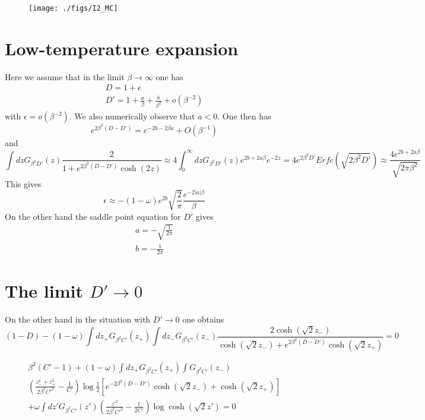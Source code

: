 \documentclass[onecolumn,superscriptaddress,pr]{revtex4}
\begin{document}
\begin{figure}[t]
\texttt{[image: ./figs/I2\_MC]}
\caption{\label{renyi}
}
\end{figure}

\section{Low-temperature expansion}

Here we assume that in the limit $\beta\to\infty$ 
one has 
%
\begin{eqnarray}
D=1+\epsilon\\
D'=1+\frac{a}{\beta}+\frac{b}{\beta^2}+{o}(\beta^{-2})
\end{eqnarray}
%
with $\epsilon=o(\beta^{-2})$. We also numerically observe that 
$a<0$. One then has 
%
\begin{equation}
e^{2\beta^2(D-D')}=e^{-2b-2\beta a}+O(\beta^{-1})
\end{equation}
%
and
%
\begin{equation}
\int dz G_{\beta^2D'}(z)\frac{2}{1+e^{2\beta^2(D-D')}\cosh(2z)}\approx
4\int_0^\infty dzG_{\beta^2D'}(z)e^{2b+2a\beta}e^{-2z}=4e^{2\beta^2D'}Erfc(\sqrt{2\beta^2D'})
\approx \frac{4e^{2b+2a\beta}}{\sqrt{2\pi\beta^2}}
\end{equation}
%
This gives
%
\begin{equation}
\epsilon\approx -(1-\omega)e^{2b}\sqrt{\frac{2}{\pi}}\frac{e^{-2|a|\beta}}{\beta}
\end{equation}
%
On the other hand the saddle point equation for $D'$ gives 
%
\begin{eqnarray}
a=-\sqrt{\frac{1}{2\pi}}\\
b=-\frac{1}{2\pi}
\end{eqnarray}
%

\section{The limit $D'\to 0$}

On the other hand in the situation with $D'\to 0$ one obtains 
%
\begin{equation}
(1-D)-(1-\omega)\int dz_+G_{\beta^2 C'}
(z_+)\int dz_-G_{\beta^2 C'}(z_-)\frac{2\cosh(\sqrt{2}z_-)}{\cosh(\sqrt{2}z_-)
+e^{2\beta^2(D-D')}\cosh(\sqrt{2}z_+)}=0
\end{equation}

\begin{multline}
\beta^2(C'-1)+(1-\omega)\int dz_+G_{\beta^2C'}(z_+)\int G_{\beta^2C'}(z_-)
\\
\left(\frac{z_-^2+z^2_+}{2\beta^2C'^2}-\frac{1}{C'}\right)\log\frac{1}{2}\left[e^{-2\beta^2(D-D')}\cosh(\sqrt{2}z_-)+
\cosh(\sqrt{2}z_+)\right]\\
+\omega\int dz'G_{\beta^2C'}(z')\left(\frac{z'^2}{2\beta^2C'^2}-\frac{1}{2C'}\right)
\log\cosh(\sqrt{2}z')=0
\end{multline}
\end{document}
